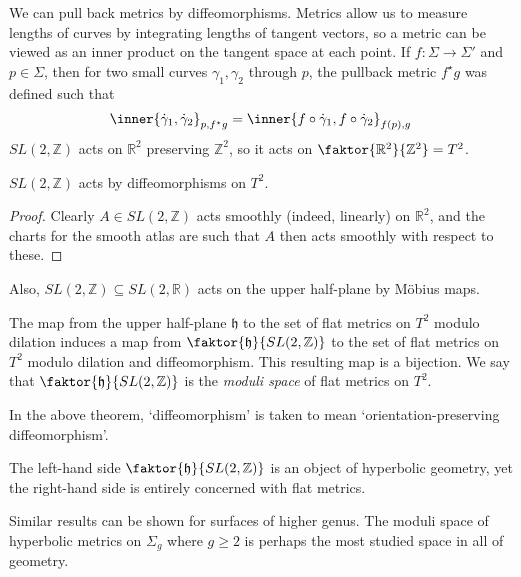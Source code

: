 We can pull back metrics by diffeomorphisms.
Metrics allow us to measure lengths of curves by integrating lengths of tangent vectors, so a metric can be viewed as an inner product on the tangent space at each point.
If $f \colon \Sigma \to \Sigma'$ and $p \in \Sigma$, then for two small curves $\gamma_1, \gamma_2$ through $p$, the pullback metric $f^\star g$ was defined such that
\begin{align*}
	\inner{\dot \gamma_1, \dot \gamma_2}_{p, f^\star g} = \inner{f \circ \dot \gamma_1, f \circ \dot \gamma_2}_{f(p), g}
\end{align*}
$SL(2,\mathbb Z)$ acts on $\mathbb R^2$ preserving $\mathbb Z^2$, so it acts on $\faktor{\mathbb R^2}{\mathbb Z^2} = T^2$.
\begin{lemma}
	$SL(2,\mathbb Z)$ acts by diffeomorphisms on $T^2$.
\end{lemma}
\begin{proof}
	Clearly $A \in SL(2,\mathbb Z)$ acts smoothly (indeed, linearly) on $\mathbb R^2$, and the charts for the smooth atlas are such that $A$ then acts smoothly with respect to these.
\end{proof}
Also, $SL(2,\mathbb Z) \subseteq SL(2,\mathbb R)$ acts on the upper half-plane by M\"obius maps.
\begin{theorem}
	The map from the upper half-plane $\mathfrak{h}$ to the set of flat metrics on $T^2$ modulo dilation induces a map from $\faktor{\mathfrak{h}}{SL(2,\mathbb Z)}$ to the set of flat metrics on $T^2$ modulo dilation and diffeomorphism.
	This resulting map is a bijection.
	We say that $\faktor{\mathfrak{h}}{SL(2,\mathbb Z)}$ is the \textit{moduli space} of flat metrics on $T^2$.
\end{theorem}
In the above theorem, `diffeomorphism' is taken to mean `orientation-preserving diffeomorphism'.
\begin{remark}
	The left-hand side $\faktor{\mathfrak{h}}{SL(2,\mathbb Z)}$ is an object of hyperbolic geometry, yet the right-hand side is entirely concerned with flat metrics.

	Similar results can be shown for surfaces of higher genus.
	The moduli space of hyperbolic metrics on $\Sigma_g$ where $g \geq 2$ is perhaps the most studied space in all of geometry.
\end{remark}

